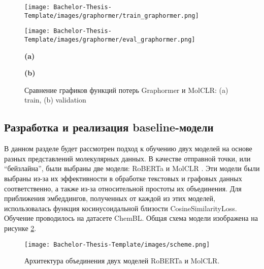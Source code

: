 \begin{figure}[h]
    \begin{minipage}{0.5\textwidth}
        \centering
        \texttt{[image: Bachelor-Thesis-Template/images/graphormer/train\_graphormer.png]}
    \end{minipage}%
    \begin{minipage}{0.5\textwidth}
        \centering
        \texttt{[image: Bachelor-Thesis-Template/images/graphormer/eval\_graphormer.png]}
    \end{minipage}%

    \newline
    \begin{minipage}{0.5\textwidth}
      \centering
    \textbf{(a)}
    \end{minipage}%
    \begin{minipage}{0.5\textwidth}
    \centering
    \textbf{(b)}
    \end{minipage}%
    
    \caption{\small Сравнение графиков функций потерь Graphormer и MolCLR: (a) train, (b) validation}
    \label{fig:graphormer_vs_molclr_loss}
\end{figure}

\subsection{Разработка и реализация baseline-модели}
В данном разделе будет рассмотрен подход к обучению двух моделей на основе разных представлений молекулярных данных. В качестве отправной точки, или “бейзлайна”, были выбраны две модели: RoBERTa \cite{liu2019roberta} и MolCLR \cite{molclr}. Эти модели были выбраны из-за их эффективности в обработке текстовых и графовых данных соответственно, а также из-за относительной простоты их объединения. Для приближения эмбеддингов, полученных от каждой из этих моделей, использовалась функция косинусоидальной близости CosineSimilarityLoss. Обучение проводилось на датасете ChemBL. \cite{ChemBL}
Общая схема модели изображена на рисунке \ref{fig:bert_plus_molclr}.

\begin{figure}[h]
    \centering
    \texttt{[image: Bachelor-Thesis-Template/images/scheme.png]}
    
    \caption{\small Архитектура объединения двух моделей RoBERTa и MolCLR.}
    \label{fig:bert_plus_molclr}
\end{figure}

